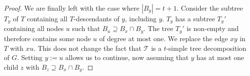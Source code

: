 \documentclass[kpfonts]{patmorin}
\theoremstyle{named}
\begin{document}
\begin{proof}

    We are finally left with the case where $|B_y|=t+1$.
    Consider the subtree $T_y$ of $T$ containing all $T$-descendants of $y$, including $y$.  $T_y$ has a subtree $T_y'$ containing all nodes $u$ such that $B_u\supseteq B_x\cap B_y$.  The tree $T_y'$ is non-empty and therefore contains some node $u$ of degree at most one.  We replace the edge $xy$ in $T$ with $xu$.  This does not change the fact that $\mathcal{T}$ is a $t$-simple tree decomposition of $G$.  Setting $y:=u$ allows us to continue, now assuming that $y$ has at most one child $z$ with $B_z\supseteq B_x\cap B_y$.


\end{proof}
\end{document}

